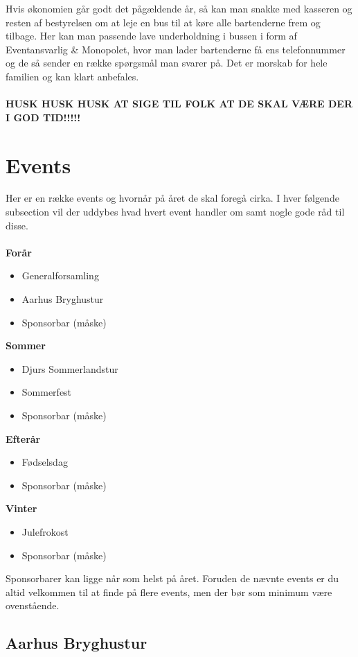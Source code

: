 Hvis økonomien går godt det pågældende år, så kan man snakke med kasseren og resten af bestyrelsen om at leje en bus til at køre alle bartenderne frem og tilbage. Her kan man passende lave underholdning i bussen i form af Eventansvarlig \& Monopolet, hvor man lader bartenderne få ens telefonnummer og de så sender en række spørgsmål man svarer på. Det er morskab for hele familien og kan klart anbefales.
\\ \\
\textbf{HUSK HUSK HUSK AT SIGE TIL FOLK AT DE SKAL VÆRE DER I GOD TID!!!!!}

\section*{Events}
\label{sec:arskalender}
Her er en række events og hvornår på året de skal foregå cirka. I hver følgende subsection vil der uddybes hvad hvert event handler om samt nogle gode råd til disse. \\ \\
\textbf{Forår}
  \begin{itemize}
  \item Generalforsamling
  \item Aarhus Bryghustur
  \item Sponsorbar (måske)
  \end{itemize}
\textbf{Sommer}
  \begin{itemize}
  \item Djurs Sommerlandstur
  \item Sommerfest
  \item Sponsorbar (måske)
  \end{itemize}
\textbf{Efterår}
  \begin{itemize}
  \item Fødselsdag
  \item Sponsorbar (måske)
  \end{itemize}
\textbf{Vinter}
  \begin{itemize}
  \item Julefrokost
  \item Sponsorbar (måske)
  \end{itemize}

\noindent Sponsorbarer kan ligge når som helst på året. Foruden de nævnte events er du altid velkommen til at finde på flere events, men der bør som minimum være ovenstående.

\subsection*{Aarhus Bryghustur}
\label{sec:aarhus-bryghus}

